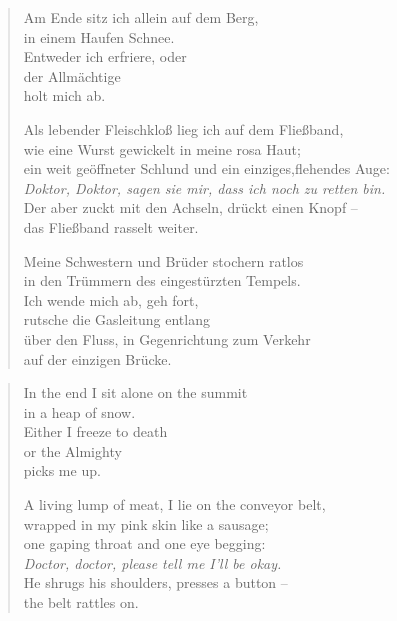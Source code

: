 
\cleartoverso

{\setlength{\stanzaskip}{0.6em}


\begin{verse}
Am Ende sitz ich allein auf dem Berg,\\
in einem Haufen Schnee.\\
Entweder ich erfriere, oder\\
der Allmächtige\\
holt mich ab.

\rhytmbreak

Als lebender Fleischkloß lieg ich auf dem Fließband,\\
wie eine Wurst gewickelt in meine rosa Haut;\\
ein weit geöffneter Schlund und ein einziges,\verselinebreak flehendes Auge:\\
\emph{Doktor, Doktor, sagen sie mir, dass ich noch zu retten bin.}\\
Der aber zuckt mit den Achseln, drückt einen Knopf --\\
das Fließband rasselt weiter.

\rhytmbreak

Meine Schwestern und Brüder stochern ratlos\\
in den Trümmern des eingestürzten Tempels.\\
Ich wende mich ab, geh fort,\\
rutsche die Gasleitung entlang\\
über den Fluss, in Gegenrichtung zum Verkehr\\
auf der einzigen Brücke.

\rhytmbreak

\end{verse}

\clearpage


\begin{verse}
In the end I sit alone on the summit\\
in a heap of snow.\\
Either I freeze to death\\
or the Almighty\\
picks me up.

\rhytmbreak

A living lump of meat, I lie on the conveyor belt,\\
wrapped in my pink skin like a sausage;\\
one gaping throat and one eye begging:\\
\emph{Doctor, doctor, please tell me I'll be okay.}\\
He shrugs his shoulders, presses a button --\\
the belt rattles on.


\end{verse}}
